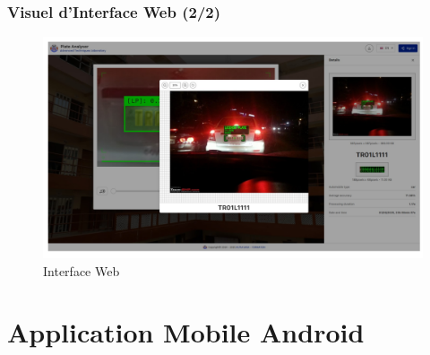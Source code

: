 \documentclass[
	11pt,
	aspectratio=169,
]{beamer}
\begin{document}
\begin{frame}
	\frametitle{Visuel d'Interface Web (2/2)}
	
	\begin{figure}
		\includegraphics[width=0.9\linewidth]{Images/image2.png}
		\caption{Interface Web}
	\end{figure}
\end{frame}




\section{Application Mobile Android}
\end{document}

